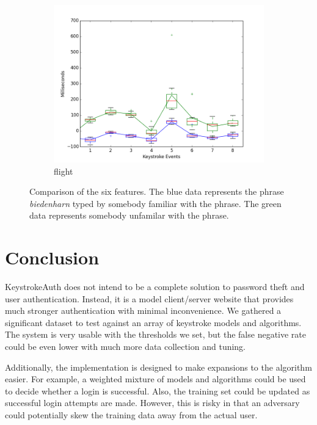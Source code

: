 \documentclass{article}
\begin{document}
\begin{figure}[H]
  \begin{subfigure}[b]{0.3\textwidth}
    \includegraphics[width=\textwidth]{biedenharn_jordan_flight_final.png}
    \caption{flight}
    \label{all_graphs:flight}
  \end{subfigure}
  \caption{Comparison of the six features. The blue data represents the phrase \textit{biedenharn} typed by somebody familiar with the phrase. The green data represents somebody unfamilar with the phrase.}
  \label{all_graphs}
\end{figure}

\section{Conclusion}
KeystrokeAuth does not intend to be a complete solution to password theft and user authentication. Instead, it is a model client/server website that provides much stronger authentication with minimal inconvenience. We gathered a significant dataset to test against an array of keystroke models and algorithms. The system is very usable with the thresholds we set, but the false negative rate could be even lower with much more data collection and tuning.

Additionally, the implementation is designed to make expansions to the algorithm easier. For example, a weighted mixture of models and algorithms could be used to decide whether a login is successful. Also, the training set could be updated as successful login attempts are made. However, this is risky in that an adversary could potentially skew the training data away from the actual user.
\end{document}
